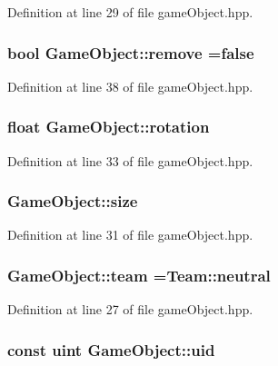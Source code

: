 Definition at line 29 of file game\-Object.\-hpp.

\hypertarget{class_game_object_ae939c981c524a76645abf33cd48b4214}{
\subsubsection[{remove}]{\setlength{\rightskip}{0pt plus 5cm}bool Game\-Object\-::remove =false}}\label{class_game_object_ae939c981c524a76645abf33cd48b4214}


Definition at line 38 of file game\-Object.\-hpp.

\hypertarget{class_game_object_ac55f6ebdf4cfbab508680ad7290fb26c}{
\subsubsection[{rotation}]{\setlength{\rightskip}{0pt plus 5cm}float Game\-Object\-::rotation}}\label{class_game_object_ac55f6ebdf4cfbab508680ad7290fb26c}


Definition at line 33 of file game\-Object.\-hpp.

\hypertarget{class_game_object_a28b3023a0c6dd731677123869d32885d}{
\subsubsection[{size}]{ Game\-Object\-::size}}\label{class_game_object_a28b3023a0c6dd731677123869d32885d}


Definition at line 31 of file game\-Object.\-hpp.

\hypertarget{class_game_object_a96c15a190af02288f73bb11051b5d2d7}{
\subsubsection[{team}]{ Game\-Object\-::team =Team\-::neutral}}\label{class_game_object_a96c15a190af02288f73bb11051b5d2d7}


Definition at line 27 of file game\-Object.\-hpp.

\hypertarget{class_game_object_a8b00d8f156dd11c32aacf3d14d57b612}{
\subsubsection[{uid}]{\setlength{\rightskip}{0pt plus 5cm}const {\bf uint} Game\-Object\-::uid}}\label{class_game_object_a8b00d8f156dd11c32aacf3d14d57b612}


